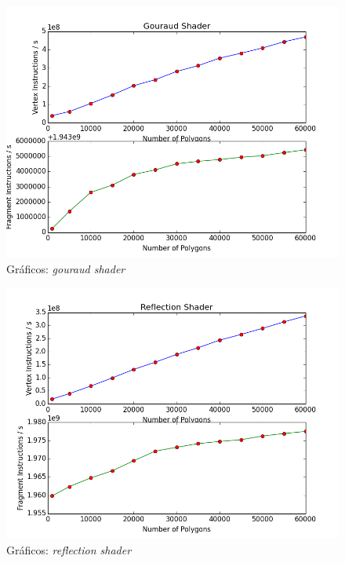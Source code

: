 	\begin{figure}[h]
	\centering
		\includegraphics[keepaspectratio=true,scale=0.6]{figuras/gouplot.png}
	\caption{Gráficos: \textit{gouraud shader}}
	\label{plotgou}
	\end{figure}
 
	\begin{figure}[h]
	\centering
		\includegraphics[keepaspectratio=true,scale=0.6]{figuras/reflectionplot.png}
	\caption{Gráficos: \textit{reflection shader}}
	\label{plotrefl}
	\end{figure}

